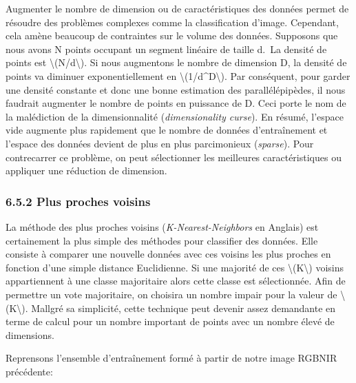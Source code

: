 \documentclass[
]{article}
\begin{document}
Augmenter le nombre de dimension ou de caractéristiques des données
permet de résoudre des problèmes complexes comme la classification
d'image. Cependant, cela amène beaucoup de contraintes sur le volume des
données. Supposons que nous avons N points occupant un segment linéaire
de taille d.~La densité de points est
{\textbackslash(N/d\textbackslash)}. Si nous augmentons le nombre de
dimension D, la densité de points va diminuer exponentiellement en
{\textbackslash(1/d\^{}D\textbackslash)}. Par conséquent, pour garder
une densité constante et donc une bonne estimation des parallélépipèdes,
il nous faudrait augmenter le nombre de points en puissance de D. Ceci
porte le nom de la malédiction de la dimensionnalité
(\emph{dimensionality curse}). En résumé, l'espace vide augmente plus
rapidement que le nombre de données d'entraînement et l'espace des
données devient de plus en plus parcimonieux (\emph{sparse}). Pour
contrecarrer ce problème, on peut sélectionner les meilleures
caractéristiques ou appliquer une réduction de dimension.

\subsubsection{\texorpdfstring{{6.5.2} Plus proches
voisins}{6.5.2 Plus proches voisins}}\label{plus-proches-voisins}

La méthode des plus proches voisins (\emph{K-Nearest-Neighbors} en
Anglais) est certainement la plus simple des méthodes pour classifier
des données. Elle consiste à comparer une nouvelle données avec ces
voisins les plus proches en fonction d'une simple distance Euclidienne.
Si une majorité de ces {\textbackslash(K\textbackslash)} voisins
appartiennent à une classe majoritaire alors cette classe est
sélectionnée. Afin de permettre un vote majoritaire, on choisira un
nombre impair pour la valeur de {\textbackslash(K\textbackslash)}.
Mallgré sa simplicité, cette technique peut devenir assez demandante en
terme de calcul pour un nombre important de points avec un nombre élevé
de dimensions.

Reprensons l'ensemble d'entraînement formé à partir de notre image
RGBNIR précédente:
\end{document}
